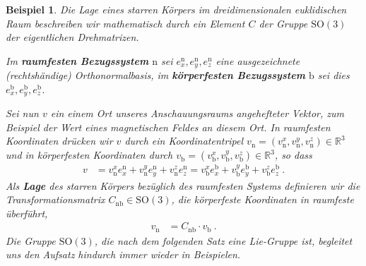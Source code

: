 \documentclass[10pt,a4paper]{article}
\theoremstyle{mytheorem}
\theoremstyle{mydefinition}
\newtheorem{example}[theorem]{Beispiel}
\newcommand{\mydef}[1]{\textbf{\textit{#1}}}
\newcommand{\SO}{\mathrm{SO}}
\newcommand{\body}{\mathrm{b}}
\newcommand{\nav}{\mathrm{n}}
\begin{document}
\begin{example}
\label{ex:attitude}
Die Lage eines starren Körpers im dreidimensionalen euklidischen Raum beschreiben wir mathematisch durch ein Element $C$ der Gruppe $\SO(3)$ der eigentlichen Drehmatrizen.

Im \mydef{raumfesten Bezugssystem} $\nav$ sei $e_x^\nav, e_y^\nav, e_z^\nav$ eine ausgezeichnete (rechtshändige) Orthonormalbasis, im \mydef{körperfesten Bezugssystem} $\body$ sei dies $e_x^\body, e_y^\body, e_z^\body$.

Sei nun $v$ ein einem Ort unseres Anschauungsraums angehefteter Vektor, zum Beispiel der Wert eines magnetischen Feldes an diesem Ort.
In raumfesten Koordinaten drücken wir $v$ durch ein Koordinatentripel
$v_\nav=(v_\nav^x, v_\nav^y, v_\nav^z)\in\mathbb{R}^3$ und in körperfesten Koordinaten durch  $v_\body=(v_\body^x, v_\body^y, v_\body^z)\in\mathbb{R}^3$, so dass
\begin{align*}
	v &=
	v_\nav^x e_x^\nav
	+ v_\nav^y e_y^\nav
	+ v_\nav^z e_z^\nav
	=
	v_\body^x e_x^\body
	+ v_\body^y e_y^\body
	+ v_\body^z e_z^\body
	\ .
\end{align*}
Als \mydef{Lage} des starren Körpers bezüglich des raumfesten Systems definieren wir die Transformationsmatrix $C_{\nav\body}\in\SO(3)$, die körperfeste Koordinaten in raumfeste überführt,
\begin{align*}
	v_\nav &= C_{\nav\body} \cdot v_\body
	\ .
\end{align*}
Die Gruppe $\SO(3)$, die nach dem folgenden Satz eine Lie-Gruppe ist, begleitet uns den Aufsatz hindurch immer wieder in Beispielen.
\end{example}
\end{document}
